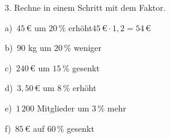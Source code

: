 \documentclass[11pt]{article}
\newcommand{\grau}[1]{{\color{mbgrau}#1}}
\begin{document}
\begin{pfaufg}{}{3.}{}
Rechne in einem Schritt mit dem Faktor.\par\medskip
\grau{a)\ $45\,€$ um $20\,\%$ erhöht\quad $45\,€ \cdot 1{,}2 = 54\,€$}\par\medskip
\noindent\begin{minipage}[t]{0.48\linewidth}
b)\ $90$ kg um $20\,\%$ weniger
\end{minipage}\hfill
\begin{minipage}[t]{0.48\linewidth}
c)\ $240\,€$ um $15\,\%$ gesenkt
\end{minipage}
\noindent\begin{minipage}[t]{0.48\linewidth}
d)\ $3{,}50\,€$ um $8\,\%$ erhöht
\end{minipage}\hfill
\begin{minipage}[t]{0.48\linewidth}
e)\ $1\,200$ Mitglieder um $3\,\%$ mehr
\end{minipage}
\noindent\begin{minipage}[t]{0.48\linewidth}
f)\ $85\,€$ auf $60\,\%$ gesenkt
\end{minipage}
\end{pfaufg}
\end{document}
